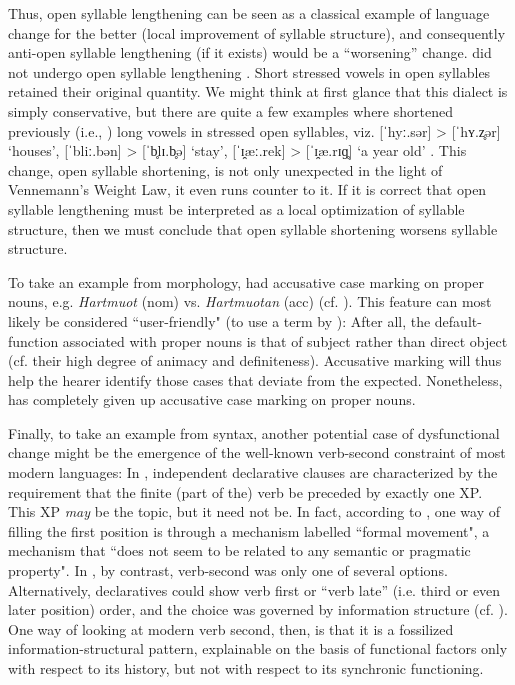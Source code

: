 \documentclass[output=paper,hidelinks]{langscibook}
\begin{document}
Thus, open syllable lengthening can be seen as a classical example of language change for the better (local improvement of syllable structure), and consequently anti-open syllable lengthening (if it exists) would be a ``worsening'' change.   did not undergo open syllable lengthening \citep{Seiler_2005}. Short stressed vowels in open syllables retained their original quantity. We might think at first glance that this dialect is simply conservative, but there are quite a few examples where  shortened previously (i.e., ) long vowels in stressed open syllables, viz. 
[ˈhyː.sər] > [ˈhʏ.z̥ər] `houses', 
[ˈbliː.bən] > [ˈb̥lɪ.b̥ə] `stay',
[ˈɪ̯æː.rek] > [ˈɪ̯æ.rɪɡ̥] `a year old'
\citep[477]{Seiler_2005}. This change, open syllable shortening, is not only unexpected in the light of Vennemann's Weight Law, it even runs counter to it. If it is correct that open syllable lengthening must be interpreted as a local optimization of syllable structure, then we must conclude that  open syllable shortening worsens syllable structure.

To take an example from morphology,  had accusative case marking on proper nouns, e.g. \textit{Hartmuot} (nom) vs.  \textit{Hartmuotan} (acc) (cf. \citealt[186--187]{Braune_2004}). This feature can most likely be considered ``user-friendly" (to use a term by \citealt[191]{Haspelmath1999optimality}): After all, the default-function associated with proper nouns is that of subject rather than direct object (cf. their high degree of animacy and definiteness). Accusative marking will thus help the hearer identify those cases that deviate from the expected. Nonetheless,  has completely given up accusative case marking on proper nouns.

Finally, to take an example from syntax, another potential case of dysfunctional change might be the emergence of the well-known verb-second constraint of most modern  languages: In , independent declarative clauses are characterized by the requirement that the finite (part of the) verb be preceded by exactly one XP. This XP \textit{may} be the topic, but it need not be. In fact, according to \citet[9]{Frey_2004}, one way of filling the first position is through a mechanism labelled ``formal movement", a mechanism that ``does not seem to be related to any semantic or pragmatic property". In , by contrast, verb-second was only one of several options. Alternatively, declaratives could show verb first or ``verb late'' (i.e. third or even later position) order, and the choice was governed by information structure (cf. \citealt{HinterhölzlPetrova_2010, HinterhölzlPetrova_2011}). One way of looking at modern verb second, then, is that it is a fossilized information-structural pattern, explainable on the basis of functional factors only with respect to its history, but not with respect to its synchronic functioning.
\end{document}
